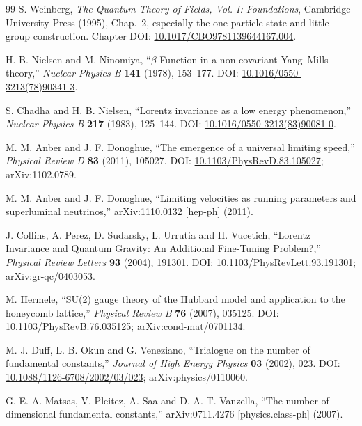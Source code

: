 \documentclass[11pt,a4paper]{article}
\begin{document}
\begin{thebibliography}{99}
S. Weinberg, \emph{The Quantum Theory of Fields, Vol. I: Foundations}, Cambridge University Press (1995), Chap.~2, especially the one-particle-state and little-group construction. Chapter DOI: \href{https://doi.org/10.1017/CBO9781139644167.004}{10.1017/CBO9781139644167.004}.

H. B. Nielsen and M. Ninomiya, ``$\beta$-Function in a non-covariant Yang--Mills theory,'' \emph{Nuclear Physics B} \textbf{141} (1978), 153--177. DOI: \href{https://doi.org/10.1016/0550-3213(78)90341-3}{10.1016/0550-3213(78)90341-3}.

S. Chadha and H. B. Nielsen, ``Lorentz invariance as a low energy phenomenon,'' \emph{Nuclear Physics B} \textbf{217} (1983), 125--144. DOI: \href{https://doi.org/10.1016/0550-3213(83)90081-0}{10.1016/0550-3213(83)90081-0}.

M. M. Anber and J. F. Donoghue, ``The emergence of a universal limiting speed,'' \emph{Physical Review D} \textbf{83} (2011), 105027. DOI: \href{https://doi.org/10.1103/PhysRevD.83.105027}{10.1103/PhysRevD.83.105027}; arXiv:1102.0789.

M. M. Anber and J. F. Donoghue, ``Limiting velocities as running parameters and superluminal neutrinos,'' arXiv:1110.0132 [hep-ph] (2011).

J. Collins, A. Perez, D. Sudarsky, L. Urrutia and H. Vucetich, ``Lorentz Invariance and Quantum Gravity: An Additional Fine-Tuning Problem?,'' \emph{Physical Review Letters} \textbf{93} (2004), 191301. DOI: \href{https://doi.org/10.1103/PhysRevLett.93.191301}{10.1103/PhysRevLett.93.191301}; arXiv:gr-qc/0403053.

M. Hermele, ``SU(2) gauge theory of the Hubbard model and application to the honeycomb lattice,'' \emph{Physical Review B} \textbf{76} (2007), 035125. DOI: \href{https://doi.org/10.1103/PhysRevB.76.035125}{10.1103/PhysRevB.76.035125}; arXiv:cond-mat/0701134.

M. J. Duff, L. B. Okun and G. Veneziano, ``Trialogue on the number of fundamental constants,'' \emph{Journal of High Energy Physics} \textbf{03} (2002), 023. DOI: \href{https://doi.org/10.1088/1126-6708/2002/03/023}{10.1088/1126-6708/2002/03/023}; arXiv:physics/0110060.

G. E. A. Matsas, V. Pleitez, A. Saa and D. A. T. Vanzella, ``The number of dimensional fundamental constants,'' arXiv:0711.4276 [physics.class-ph] (2007).


\end{thebibliography}
\end{document}
